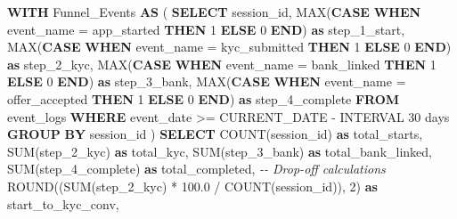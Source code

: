 \documentclass[
  11pt,
  openany,
  oneside]{book}
\newenvironment{Shaded}{}{}
\newcommand{\CommentTok}[1]{\textcolor[rgb]{0.38,0.63,0.69}{\textit{#1}}}
\newcommand{\ControlFlowTok}[1]{\textcolor[rgb]{0.00,0.44,0.13}{\textbf{#1}}}
\newcommand{\DataTypeTok}[1]{\textcolor[rgb]{0.56,0.13,0.00}{#1}}
\newcommand{\DecValTok}[1]{\textcolor[rgb]{0.25,0.63,0.44}{#1}}
\newcommand{\FloatTok}[1]{\textcolor[rgb]{0.25,0.63,0.44}{#1}}
\newcommand{\FunctionTok}[1]{\textcolor[rgb]{0.02,0.16,0.49}{#1}}
\newcommand{\KeywordTok}[1]{\textcolor[rgb]{0.00,0.44,0.13}{\textbf{#1}}}
\newcommand{\NormalTok}[1]{#1}
\newcommand{\OperatorTok}[1]{\textcolor[rgb]{0.40,0.40,0.40}{#1}}
\newcommand{\StringTok}[1]{\textcolor[rgb]{0.25,0.44,0.63}{#1}}
\begin{document}
\begin{Shaded}
\begin{Highlighting}[]
\KeywordTok{WITH}\NormalTok{ Funnel\_Events }\KeywordTok{AS}\NormalTok{ (}
    \KeywordTok{SELECT} 
\NormalTok{        session\_id,}
        \FunctionTok{MAX}\NormalTok{(}\ControlFlowTok{CASE} \ControlFlowTok{WHEN}\NormalTok{ event\_name }\OperatorTok{=} \StringTok{\textquotesingle{}app\_started\textquotesingle{}} \ControlFlowTok{THEN} \DecValTok{1} \ControlFlowTok{ELSE} \DecValTok{0} \ControlFlowTok{END}\NormalTok{) }\KeywordTok{as}\NormalTok{ step\_1\_start,}
        \FunctionTok{MAX}\NormalTok{(}\ControlFlowTok{CASE} \ControlFlowTok{WHEN}\NormalTok{ event\_name }\OperatorTok{=} \StringTok{\textquotesingle{}kyc\_submitted\textquotesingle{}} \ControlFlowTok{THEN} \DecValTok{1} \ControlFlowTok{ELSE} \DecValTok{0} \ControlFlowTok{END}\NormalTok{) }\KeywordTok{as}\NormalTok{ step\_2\_kyc,}
        \FunctionTok{MAX}\NormalTok{(}\ControlFlowTok{CASE} \ControlFlowTok{WHEN}\NormalTok{ event\_name }\OperatorTok{=} \StringTok{\textquotesingle{}bank\_linked\textquotesingle{}} \ControlFlowTok{THEN} \DecValTok{1} \ControlFlowTok{ELSE} \DecValTok{0} \ControlFlowTok{END}\NormalTok{) }\KeywordTok{as}\NormalTok{ step\_3\_bank,}
        \FunctionTok{MAX}\NormalTok{(}\ControlFlowTok{CASE} \ControlFlowTok{WHEN}\NormalTok{ event\_name }\OperatorTok{=} \StringTok{\textquotesingle{}offer\_accepted\textquotesingle{}} \ControlFlowTok{THEN} \DecValTok{1} \ControlFlowTok{ELSE} \DecValTok{0} \ControlFlowTok{END}\NormalTok{) }\KeywordTok{as}\NormalTok{ step\_4\_complete}
    \KeywordTok{FROM}\NormalTok{ event\_logs}
    \KeywordTok{WHERE}\NormalTok{ event\_date }\OperatorTok{\textgreater{}=} \FunctionTok{CURRENT\_DATE} \OperatorTok{{-}} \DataTypeTok{INTERVAL} \StringTok{\textquotesingle{}30 days\textquotesingle{}}
    \KeywordTok{GROUP} \KeywordTok{BY}\NormalTok{ session\_id}
\NormalTok{)}
\KeywordTok{SELECT} 
    \FunctionTok{COUNT}\NormalTok{(session\_id) }\KeywordTok{as}\NormalTok{ total\_starts,}
    \FunctionTok{SUM}\NormalTok{(step\_2\_kyc) }\KeywordTok{as}\NormalTok{ total\_kyc,}
    \FunctionTok{SUM}\NormalTok{(step\_3\_bank) }\KeywordTok{as}\NormalTok{ total\_bank\_linked,}
    \FunctionTok{SUM}\NormalTok{(step\_4\_complete) }\KeywordTok{as}\NormalTok{ total\_completed,}
    \CommentTok{{-}{-} Drop{-}off calculations}
    \FunctionTok{ROUND}\NormalTok{((}\FunctionTok{SUM}\NormalTok{(step\_2\_kyc) }\OperatorTok{*} \FloatTok{100.0} \OperatorTok{/} \FunctionTok{COUNT}\NormalTok{(session\_id)), }\DecValTok{2}\NormalTok{) }\KeywordTok{as}\NormalTok{ start\_to\_kyc\_conv,}

\end{Highlighting}
\end{Shaded}
\end{document}
